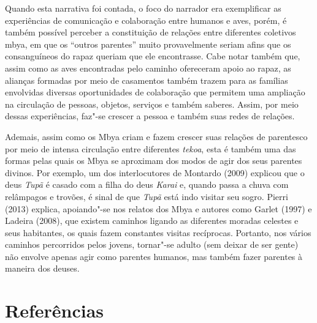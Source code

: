 Quando esta narrativa foi contada, o foco do narrador era exemplificar
as experiências de comunicação e colaboração entre humanos e aves,
porém, é também possível perceber a constituição de relações entre
diferentes coletivos mbya, em que os ``outros parentes'' muito
provavelmente seriam afins que os consanguíneos do rapaz queriam que
ele encontrasse. Cabe notar também que, assim como as aves encontradas
pelo caminho ofereceram apoio ao rapaz, as alianças formadas por meio
de casamentos também trazem para as famílias envolvidas diversas
oportunidades de colaboração que permitem uma ampliação na circulação
de pessoas, objetos, serviços e também saberes. Assim, por meio dessas
experiências, faz"-se crescer a pessoa e também suas redes de relações.

Ademais, assim como os Mbya criam e fazem crescer suas relações de
parentesco por meio de intensa circulação entre diferentes \emph{tekoa}, esta
é também uma das formas pelas quais os Mbya se aproximam dos modos de
agir dos seus parentes divinos. Por exemplo, um dos interlocutores de
Montardo (2009) explicou que o deus \emph{Tupã} é casado com a filha do deus
\emph{Karai} e, quando passa a chuva com relâmpagos e trovões, é sinal de que
\emph{Tupã} está indo visitar seu sogro. Pierri (2013) explica, apoiando"-se
nos relatos dos Mbya e autores como Garlet (1997) e Ladeira (2008), que
existem caminhos ligando as diferentes moradas celestes e seus
habitantes, os quais fazem constantes visitas recíprocas. Portanto, nos
vários caminhos percorridos pelos jovens, tornar"-se adulto (sem deixar
de ser gente) não envolve apenas agir como parentes humanos, mas também
fazer parentes à maneira dos deuses.

\section{Referências}

